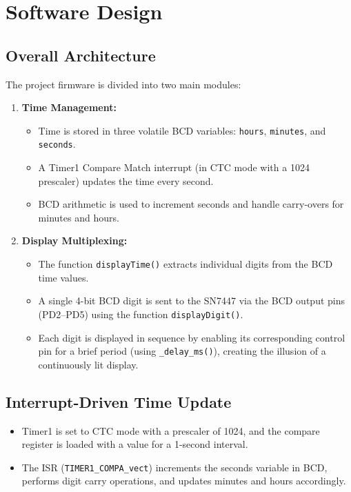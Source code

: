 \documentclass{article}
\theoremstyle{remark}
\begin{document}
\section{Software Design}
\subsection{Overall Architecture}
The project firmware is divided into two main modules:
\begin{enumerate}[label=\alph*)]
    \item \textbf{Time Management:}
    \begin{itemize}[noitemsep]
        \item Time is stored in three volatile BCD variables: \texttt{hours}, \texttt{minutes}, and \texttt{seconds}.
        \item A Timer1 Compare Match interrupt (in CTC mode with a 1024 prescaler) updates the time every second.
        \item BCD arithmetic is used to increment seconds and handle carry-overs for minutes and hours.
    \end{itemize}
    \item \textbf{Display Multiplexing:}
    \begin{itemize}[noitemsep]
        \item The function \texttt{displayTime()} extracts individual digits from the BCD time values.
        \item A single 4-bit BCD digit is sent to the SN7447 via the BCD output pins (PD2--PD5) using the function \texttt{displayDigit()}.
        \item Each digit is displayed in sequence by enabling its corresponding control pin for a brief period (using \texttt{\_delay\_ms()}), creating the illusion of a continuously lit display.
    \end{itemize}
\end{enumerate}

\subsection{Interrupt-Driven Time Update}
\begin{itemize}[noitemsep]
    \item Timer1 is set to CTC mode with a prescaler of 1024, and the compare register is loaded with a value for a 1-second interval.
    \item The ISR (\texttt{TIMER1\_COMPA\_vect}) increments the seconds variable in BCD, performs digit carry operations, and updates minutes and hours accordingly.
\end{itemize}
\end{document}
